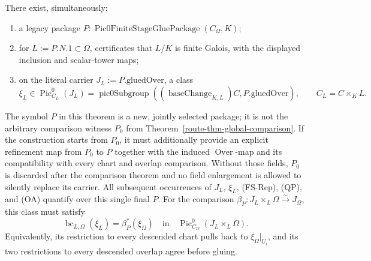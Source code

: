 \begin{theorem}
  \label{route-thm-descended-universal-class}
  \notready

  There exist, simultaneously:
  \begin{enumerate}
  \item a legacy package
    \(P:\operatorname{Pic0FiniteStageGluePackage}(C_\Omega,K)\);
  \item for \(L:=P.N.1\subset\Omega\), certificates that \(L/K\) is finite
    Galois, with the displayed inclusion and scalar-tower maps;
  \item on the literal carrier \(J_L:=P.\mathrm{gluedOver}\), a class
    \[
      \xi_L\in\operatorname{Pic}^0_{C_L}(J_L)
        =\operatorname{pic0Subgroup}
          ((\operatorname{baseChange}_{K,L})C,P.\mathrm{gluedOver}),
      \qquad C_L=C\times_KL.
    \]
  \end{enumerate}
  The symbol \(P\) in this theorem is a new, jointly selected package; it is
  not the arbitrary comparison witness \(P_0\) from
  Theorem~\ref{route-thm-global-comparison}.  If the construction starts from
  \(P_0\), it must additionally provide an explicit refinement map from
  \(P_0\) to \(P\) together with the induced \(\operatorname{Over}\)-map and
  its compatibility with every chart and overlap comparison.  Without those
  fields, \(P_0\) is discarded after the comparison theorem and no field
  enlargement is allowed to silently replace its carrier.  All subsequent
  occurrences of \(J_L\), \(\xi_L\), (FS-Rep), (QP), and (OA) quantify over
  this single final \(P\).
  For the comparison
  \(\beta_P:J_L\times_L\Omega\xrightarrow{\sim}J_\Omega\), this class must
  satisfy
  \[
    \operatorname{bc}_{L,\Omega}(\xi_L)=\beta_P^*(\xi_\Omega)
      \quad\text{in}\quad
    \operatorname{Pic}^0_{C_\Omega}(J_L\times_L\Omega).
    \tag{UC}
  \]
  Equivalently, its restriction to every descended chart pulls back to
  \(\xi_\Omega|_{U_i}\), and its two restrictions to every descended overlap
  agree before gluing.
\end{theorem}

